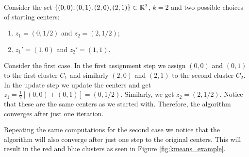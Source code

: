 \begin{example}{}{}
Consider the set $\{(0,0), (0,1), (2,0), (2,1)\} \subset \mathbb R^2$, $k = 2$ and two possible choices of starting centers:

\begin{enumerate}
    \item $z_1 = (0, 1/2)$ and $z_2 = (2, 1/2);$
    \item $z_1' = (1, 0)$ and $z_2' = (1, 1).$
\end{enumerate}

Consider the first case. In the first assignment step we assign $(0,0)$ and $(0,1)$ to the first cluster $C_1$ and similarly $(2,0)$ and $(2,1)$ to the second cluster $C_2$. In the update step we update the centers and get $z_1 = \frac{1}{2}\left[(0,0) + (0,1)\right] = (0,1/2)$. Similarly, we get $z_2 = (2,1/2)$. Notice that these are the same centers as we started with. Therefore, the algorithm converges after just one iteration.
\medskip

Repeating the same computations for the second case we notice that the algorithm will also converge after just one step to the original centers. This will result in the red and blue clusters as seen in Figure \ref{fig:kmeans_example}.


\begin{center}
\begin{minipage}{\linewidth}
\centering
\begin{minipage}[t]{0.45\textwidth}
    \centering
\end{minipage}
\end{minipage}
\end{center}
\end{example}
